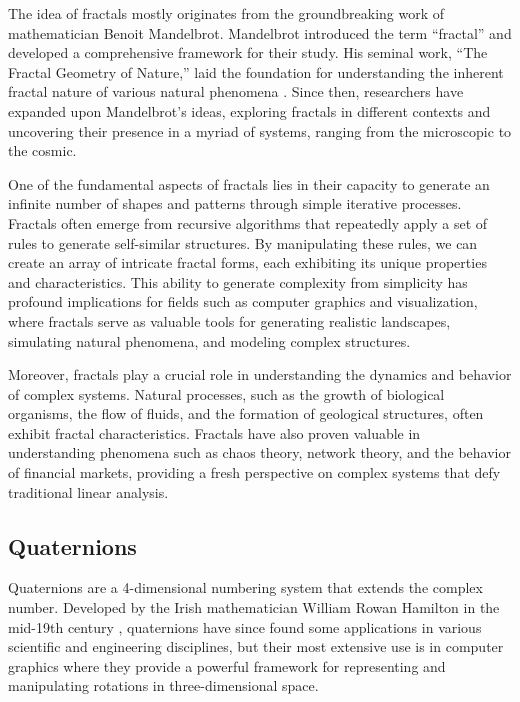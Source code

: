 \documentclass[11pt,hidelinks]{article}
\numberwithin{equation}{section} %
\theoremstyle{bf}
\theoremstyle{indentbf}
\begin{document}
The idea of fractals mostly originates from the groundbreaking work of mathematician Benoit Mandelbrot. Mandelbrot introduced the term ``fractal'' and developed a comprehensive framework for their study. His seminal work, ``The Fractal Geometry of Nature,'' laid the foundation for understanding the inherent fractal nature of various natural phenomena \cite{mandelbrot:1983}. Since then, researchers have expanded upon Mandelbrot's ideas, exploring fractals in different contexts and uncovering their presence in a myriad of systems, ranging from the microscopic to the cosmic.

One of the fundamental aspects of fractals lies in their capacity to generate an infinite number of shapes and patterns through simple iterative processes. Fractals often emerge from recursive algorithms that repeatedly apply a set of rules to generate self-similar structures. By manipulating these rules, we can create an array of intricate fractal forms, each exhibiting its unique properties and characteristics. This ability to generate complexity from simplicity has profound implications for fields such as computer graphics and visualization, where fractals serve as valuable tools for generating realistic landscapes, simulating natural phenomena, and modeling complex structures.

Moreover, fractals play a crucial role in understanding the dynamics and behavior of complex systems. Natural processes, such as the growth of biological organisms, the flow of fluids, and the formation of geological structures, often exhibit fractal characteristics. Fractals have also proven valuable in understanding phenomena such as chaos theory, network theory, and the behavior of financial markets, providing a fresh perspective on complex systems that defy traditional linear analysis. \cite{gleick:1988,barnsley:1988}

\subsection{Quaternions}
\label{sec:org01db7c1}

Quaternions are a 4-dimensional numbering system that extends the complex number. Developed by the Irish mathematician William Rowan Hamilton in the mid-19th century \cite{hamilton:1866}, quaternions have since found some applications in various scientific and engineering disciplines, but their most extensive use is in computer graphics where they provide a powerful framework for representing and manipulating rotations in three-dimensional space.
\end{document}
